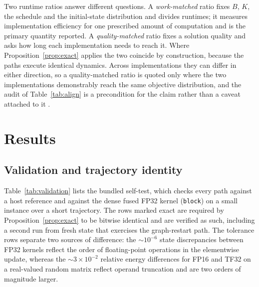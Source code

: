 \documentclass[11pt,a4paper]{article}
\newcommand{\code}[1]{\texttt{#1}}
\begin{document}
Two runtime ratios answer different questions. A \emph{work-matched} ratio fixes $B$, $K$, the schedule and the initial-state distribution and divides runtimes; it measures implementation efficiency for one prescribed amount of computation and is the primary quantity reported. A \emph{quality-matched} ratio fixes a solution quality and asks how long each implementation needs to reach it. Where Proposition~\ref{prop:exact} applies the two coincide by construction, because the paths execute identical dynamics. Across implementations they can differ in either direction, so a quality-matched ratio is quoted only where the two implementations demonstrably reach the same objective distribution, and the audit of Table~\ref{tab:align} is a precondition for the claim rather than a caveat attached to it \cite{ronnow,dunning2018}.

\section{Results}\label{sec:results}
\subsection{Validation and trajectory identity}\label{sec:res-identity}
Table~\ref{tab:validation} lists the bundled self-test, which checks every path against a host reference and against the dense fused FP32 kernel (\code{block}) on a small instance over a short trajectory. The rows marked exact are required by Proposition~\ref{prop:exact} to be bitwise identical and are verified as such, including a second run from fresh state that exercises the graph-restart path. The tolerance rows separate two sources of difference: the $\sim10^{-6}$ state discrepancies between FP32 kernels reflect the order of floating-point operations in the elementwise update, whereas the $\sim3\times10^{-2}$ relative energy differences for FP16 and TF32 on a real-valued random matrix reflect operand truncation and are two orders of magnitude larger.
\end{document}
